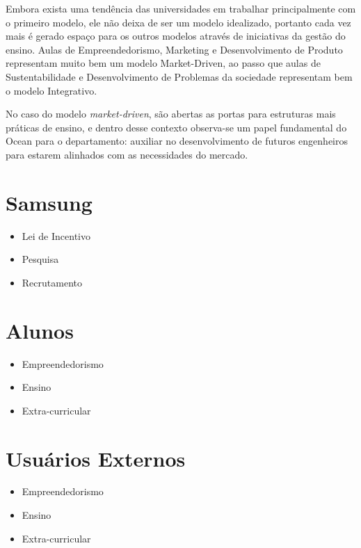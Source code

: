 Embora exista uma tendência das universidades em trabalhar principalmente com o primeiro modelo, ele não deixa de ser um modelo idealizado, portanto cada vez mais é gerado espaço para os outros modelos através de iniciativas da gestão do ensino. Aulas de Empreendedorismo, Marketing e Desenvolvimento de Produto representam muito bem um modelo Market-Driven, ao passo que aulas de Sustentabilidade e Desenvolvimento de Problemas da sociedade representam bem o modelo Integrativo.

No caso do modelo \textit{market-driven}, são abertas as portas para estruturas mais práticas de ensino, e dentro desse contexto observa-se um papel fundamental do Ocean para o departamento: auxiliar no desenvolvimento de futuros engenheiros para estarem alinhados com as necessidades do mercado. 

\section{Samsung}
\label{sec:con_samsung}

\begin{itemize}
\item Lei de Incentivo
\item Pesquisa
\item Recrutamento
\end{itemize}

\section{Alunos}
\label{sec:con_alunos}

\begin{itemize}
\item Empreendedorismo
\item Ensino
\item Extra-curricular
\end{itemize}

\section{Usuários Externos}
\label{sec:con_usuarios}

\begin{itemize}
\item Empreendedorismo
\item Ensino
\item Extra-curricular
\end{itemize}